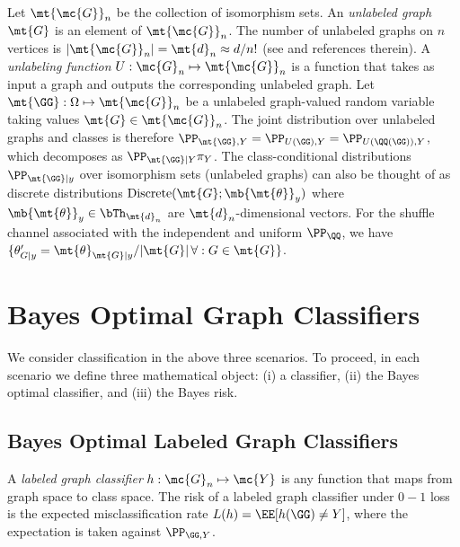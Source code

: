 \documentclass[10pt,journal,cspaper,compsoc]{IEEEtran}
\begin{document}
Let $\mt{\mc{G}}_n$ be the collection of isomorphism sets.
An \emph{unlabeled graph} $\mt{G}$ is an element of $\mt{\mc{G}}_n$. The number of unlabeled graphs on $n$ vertices is $|\mt{\mc{G}}_n|=\mt{d}_n \approx d/n!$ (see \cite{oeis.org/A000088} and references therein).
A \emph{unlabeling function} $U: \mc{G}_n \mapsto \mt{\mc{G}}_n$ is a function that takes as input a graph and outputs the corresponding unlabeled graph. Let $\mt{\GG}: \Omega \mapsto \mt{\mc{G}}_n$ be a unlabeled graph-valued random variable taking values $\mt{G} \in \mt{\mc{G}}_n$.   The joint distribution over unlabeled graphs and classes is therefore
$\PP_{\mt{\GG},Y}=\PP_{U(\GG),Y}=\PP_{U(\QQ(\GG)),Y}$, which decomposes as $\PP_{\mt{\GG}|Y} \pi_Y$. The class-conditional distributions $\PP_{\mt{\GG} | y}$ over isomorphism sets (unlabeled graphs) can also be thought of as discrete distributions $\text{Discrete}(\mt{G}; \mb{\mt{\theta}}_y)$ where $\mb{\mt{\theta}}_y\in \bTh_{\mt{d}_n}$ are $\mt{d}_n$-dimensional vectors.    For the shuffle channel associated with the independent and uniform $\PP_{\QQ}$, we have $\{\theta_{G|y}'=\mt{\theta}_{\mt{G}|y}/|\mt{G}| \, \forall : G \in \mt{G}\}$.  




\section{Bayes Optimal Graph Classifiers} %
\label{sec:bayes_optimal_graph_classifiers}

We consider classification in the above three scenarios.  To proceed, in each scenario we define three mathematical object: (i) a classifier, (ii) the Bayes optimal classifier, and (iii) the Bayes risk.

\subsection{Bayes Optimal Labeled Graph Classifiers} %
\label{sub:labeled_graph_classifiers}


	A \emph{labeled graph classifier} $h: \mc{G}_n \mapsto \mc{Y}$ is any function that maps from graph space to class space. The risk of a labeled graph classifier under $0-1$ loss is the expected misclassification rate $L(h)=\EE[h(\GG)\neq Y]$, where the expectation is taken against $\PP_{\GG,Y}$.
	
\end{document}
